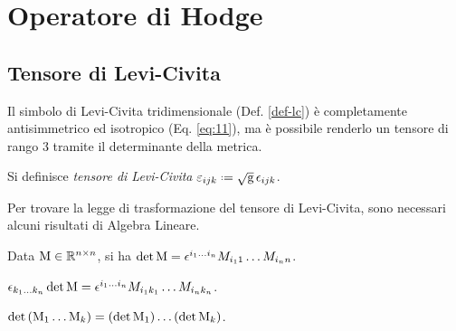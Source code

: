 \section{Operatore di Hodge}

\subsection{Tensore di Levi-Civita}

Il simbolo di Levi-Civita tridimensionale (Def. \ref{def-lc}) è completamente antisimmetrico ed isotropico (Eq. \ref{eq:11}), ma è possibile renderlo un tensore di rango 3 tramite il determinante della metrica.

\begin{definition}
	Si definisce \textit{tensore di Levi-Civita} $ \varepsilon_{ijk} \defeq \sqg \,\epsilon_{ijk} $.
\end{definition}

Per trovare la legge di trasformazione del tensore di Levi-Civita, sono necessari alcuni risultati di Algebra Lineare.

\begin{theorem}[di Laplace]
	Data $ \mathbf{\text{M}}\in\mathbb{R}^{n\times n} $, si ha $ \det\mathbf{\text{M}} = \epsilon^{i_1 \dots i_n} M_{i_1 1} \dots M_{i_n n} $.
\end{theorem}
\begin{corollary}
	$ \epsilon_{k_1 \dots k_n} \det\mathbf{\text{M}} = \epsilon^{i_1 \dots i_n} M_{i_1 k_1} \dots M_{i_n k_n} $.
\end{corollary}
\begin{corollary}\label{cor-lap}
	$ \det \left( \mathbf{\text{M}}_1 \dots \mathbf{\text{M}}_k \right) = \left( \det\mathbf{\text{M}}_1 \right) \dots \left( \det\mathbf{\text{M}}_k \right) $.
\end{corollary}

